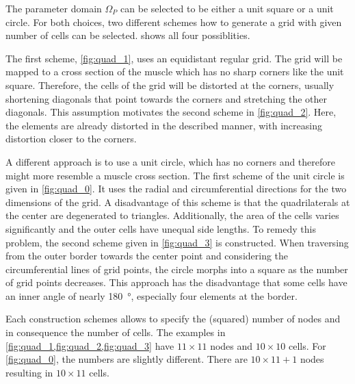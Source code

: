 The parameter domain $\Omega_P$ can be selected to be either a unit square or a unit circle. For both choices, two different schemes how to generate a grid with given number of cells can be selected.
 shows all four possiblities.

The first scheme, \cref{fig:quad_1}, uses an equidistant regular grid. The grid will be mapped to a cross section of the muscle which has no sharp corners like the unit square. Therefore, the cells of the grid will be distorted at the corners, usually shortening diagonals that point towards the corners and stretching the other diagonals. This assumption motivates the second scheme in \cref{fig:quad_2}. Here, the elements are already distorted in the described manner, with increasing distortion closer to the corners.

A different approach is to use a unit circle, which has no corners and therefore might more resemble a muscle cross section. The first scheme of the unit circle is given in \cref{fig:quad_0}. It uses the radial and circumferential directions for the two dimensions of the grid. A disadvantage of this scheme is that the quadrilaterals at the center are degenerated to triangles. Additionally, the area of the cells varies significantly and the outer cells have unequal side lengths. To remedy this problem, the second scheme given in \cref{fig:quad_3} is constructed. When traversing from the outer border towards the center point and considering the circumferential lines of grid points, the circle morphs into a square as the number of grid points decreases. This approach has the disadvantage that some cells have an inner angle of nearly \SI{180}{\degree}, especially four elements at the border.

Each construction schemes allows to specify the (squared) number of nodes and in consequence the number of cells. The examples in \cref{fig:quad_1,fig:quad_2,fig:quad_3} have $11 \times 11$ nodes and $10 \times 10$ cells. For \cref{fig:quad_0}, the numbers are slightly different. There are $10 \times 11 + 1$ nodes resulting in $10 \times 11$ cells.

